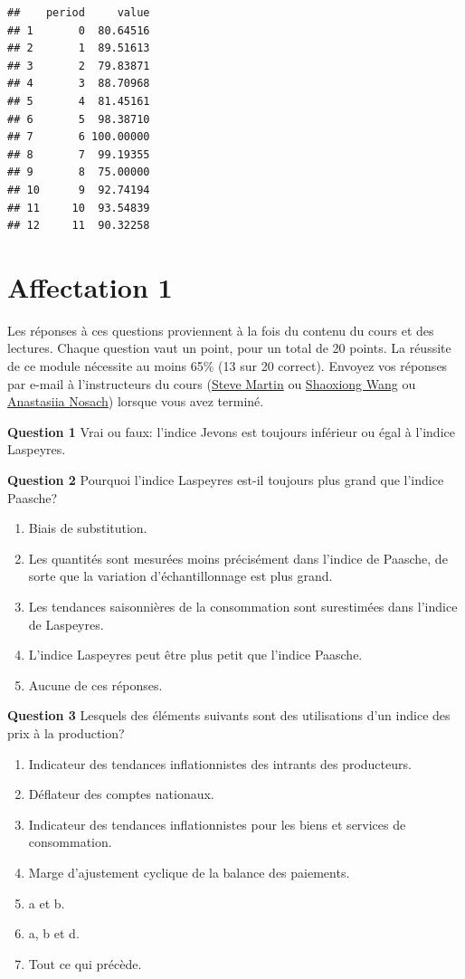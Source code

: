 \documentclass[
]{article}
\begin{document}
\begin{verbatim}
##    period     value
## 1       0  80.64516
## 2       1  89.51613
## 3       2  79.83871
## 4       3  88.70968
## 5       4  81.45161
## 6       5  98.38710
## 7       6 100.00000
## 8       7  99.19355
## 9       8  75.00000
## 10      9  92.74194
## 11     10  93.54839
## 12     11  90.32258
\end{verbatim}

\hypertarget{affectation-1}{%
\section{Affectation 1}\label{affectation-1}}

Les réponses à ces questions proviennent à la fois du contenu du cours et des lectures. Chaque question vaut un point, pour un total de 20 points. La réussite de ce module nécessite au moins 65\% (13 sur 20 correct). Envoyez vos réponses par e-mail à l'instructeurs du cours (\href{mailto:steve.martin5@canada.ca}{Steve Martin} ou \href{mailto:shaoxiong.wang@canada.ca}{Shaoxiong Wang} ou \href{mailto:anastasiia.nosach@canada.ca}{Anastasiia Nosach}) lorsque vous avez terminé.

\textbf{Question 1} Vrai ou faux: l'indice Jevons est toujours inférieur ou égal à l'indice Laspeyres.

\textbf{Question 2} Pourquoi l'indice Laspeyres est-il toujours plus grand que l'indice Paasche?

\begin{enumerate}
\def\labelenumi{\alph{enumi})}
\item
  Biais de substitution.
\item
  Les quantités sont mesurées moins précisément dans l'indice de Paasche, de sorte que la variation d'échantillonnage est
  plus grand.
\item
  Les tendances saisonnières de la consommation sont surestimées dans l'indice de Laspeyres.
\item
  L'indice Laspeyres peut être plus petit que l'indice Paasche.
\item
  Aucune de ces réponses.
\end{enumerate}

\textbf{Question 3} Lesquels des éléments suivants sont des utilisations d'un indice des prix à la production?

\begin{enumerate}
\def\labelenumi{\alph{enumi})}
\item
  Indicateur des tendances inflationnistes des intrants des producteurs.
\item
  Déflateur des comptes nationaux.
\item
  Indicateur des tendances inflationnistes pour les biens et services de consommation.
\item
  Marge d'ajustement cyclique de la balance des paiements.
\item
  a et b.
\item
  a, b et d.
\item
  Tout ce qui précède.
\end{enumerate}
\end{document}
